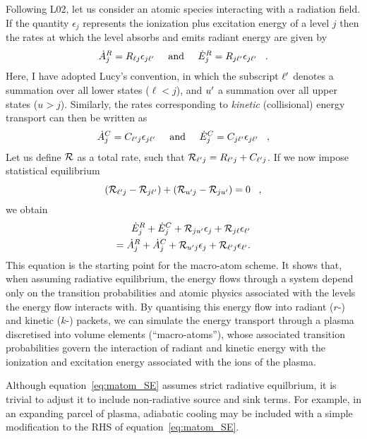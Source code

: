 Following L02, let us consider an atomic species interacting with a radiation field.
If the quantity $\epsilon_j$ represents the ionization plus excitation energy of 
a level $j$ then the rates at which the level absorbs and emits radiant energy 
are given by
\begin{equation}
 \dot{A}_{j}^{R} = R_{\ell j} \epsilon_{j {\ell^\prime}} \;\;\;\;\; {\rm and} \;\;\;
\;\;  \dot{E}_{j}^{R} = R_{j {\ell^\prime}} \epsilon_{j {\ell^\prime}} \;\;\; .
\end{equation}
Here, I have adopted Lucy's convention, in which the subscript 
${\ell^\prime}$ denotes a summation over all lower states ($\ell<j$), and
${u^\prime}$ a summation over all upper states ($u>j$).
Similarly, the rates corresponding to {\em kinetic} (collisional)
energy transport can then be written as
\begin{equation}
 \dot{A}_{j}^{C} = C_{{\ell^\prime} j} \epsilon_{j {\ell^\prime}} \;\;\;\;\; {\rm and}
\;\;\;
\;\;  \dot{E}_{j}^{C} = C_{j {\ell^\prime}} \epsilon_{j {\ell^\prime}} \;\;\; ,
\end{equation}
Let us define ${\cal R}$ as a total rate, such that
${\cal R}_{{\ell^\prime} j}  = R_{{\ell^\prime} j} + C_{{\ell^\prime} j}$.
If we now impose statistical equilibrium
%
\begin{equation}
 ({\cal R}_{{\ell^\prime} j}-{\cal R}_{j {\ell^\prime}})+({\cal R}_{{u^\prime} j}-{\cal R}_{j{u^\prime}})=0 \;\;\;,
\end{equation}
we obtain 
\begin{eqnarray}
 \dot{E}_{j}^{R}+\dot{E}_{j}^{C}+{\cal R}_{j{u^\prime}}\epsilon_{j}+
 {\cal R}_{j \ell}\epsilon_{{\ell^\prime}}  \nonumber \\  
 = \dot{A}_{j}^{R}+\dot{A}_{j}^{C}+{\cal R}_{{u^\prime} j} \epsilon_{j}
 +{\cal R}_{{\ell^\prime} j} \epsilon_{{\ell^\prime}}           .  
 \label{eq:matom_SE}     
\end{eqnarray}
This equation is the starting point for the macro-atom scheme. It shows 
that, when assuming radiative equilibrium, the energy flows through
a system depend only on the transition probabilities and atomic physics
associated with the levels the energy flow interacts with.
By quantising this energy flow into radiant ($r$-) and kinetic ($k$-) packets, 
we can simulate the energy transport through
a plasma discretised into volume elements (``macro-atoms''),
whose associated transition probabilities govern the interaction 
of radiant and kinetic energy with the ionization and excitation energy associated 
with the ions of the plasma.

Although equation~\ref{eq:matom_SE} assumes strict radiative equilbrium,
it is trivial to adjust it to include non-radiative source and sink terms. 
For example, in an expanding parcel of plasma, adiabatic cooling may be 
included with a simple modification to the RHS of equation~\ref{eq:matom_SE}.


